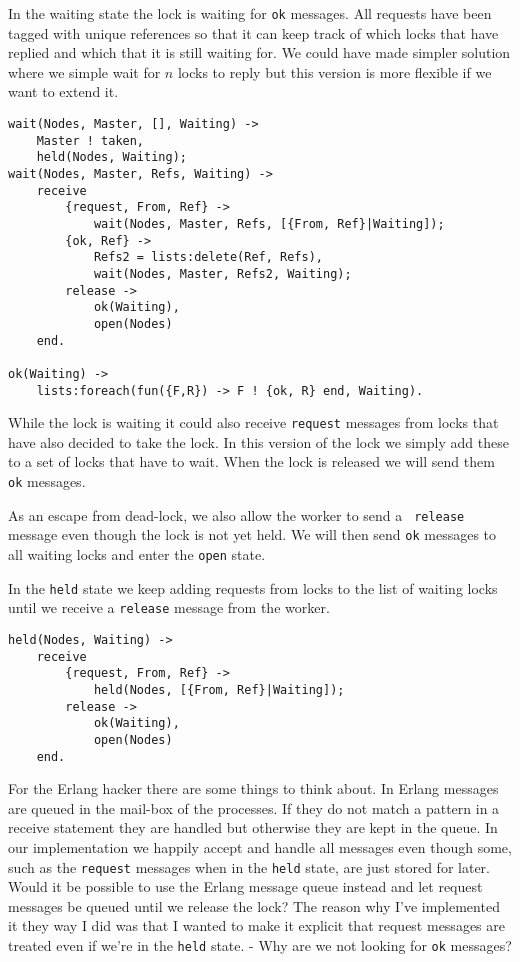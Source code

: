 \documentclass[a4paper, 11pt]{article}
\begin{document}
In the waiting state the lock is waiting for {\tt ok} messages. All requests
have been tagged with unique references so that it can keep track of
which locks that have replied and which that it is still waiting
for. We could have made simpler solution where we simple wait for $n$
locks to reply but this version is more flexible if we want to extend
it.

\begin{verbatim}
wait(Nodes, Master, [], Waiting) ->
    Master ! taken,
    held(Nodes, Waiting);
wait(Nodes, Master, Refs, Waiting) ->
    receive
        {request, From, Ref} ->
            wait(Nodes, Master, Refs, [{From, Ref}|Waiting]);
        {ok, Ref} ->
            Refs2 = lists:delete(Ref, Refs),
            wait(Nodes, Master, Refs2, Waiting);
        release ->
            ok(Waiting),            
            open(Nodes)
    end.

ok(Waiting) ->
    lists:foreach(fun({F,R}) -> F ! {ok, R} end, Waiting).
\end{verbatim}


While the lock is waiting it could also receive {\tt request} messages from
locks that have also decided to take the lock. In this version of the
lock we simply add these to a set of locks that have to wait. When the
lock is released we will send them {\tt ok} messages.

As an escape from dead-lock, we also allow the worker to send a {\tt
release} message even though the lock is not yet held. We will then
send {\tt ok} messages to all waiting locks and enter the {\tt open}
state.

In the {\tt held} state we keep adding requests from locks to the list
of waiting locks until we receive a {\tt release} message from the
worker.

\begin{verbatim}
held(Nodes, Waiting) ->
    receive
        {request, From, Ref} ->
            held(Nodes, [{From, Ref}|Waiting]);
        release ->
            ok(Waiting),
            open(Nodes)
    end.
\end{verbatim}

For the Erlang hacker there are some things to think about. In Erlang
messages are queued in the mail-box of the processes. If they do not
match a pattern in a receive statement they are handled but otherwise
they are kept in the queue. In our implementation we happily accept
and handle all messages even though some, such as the {\tt request}
messages when in the {\tt held} state, are just stored for
later. Would it be possible to use the Erlang message queue instead
and let request messages be queued until we release the lock? The
reason why I've implemented it they way I did was that I wanted to
make it explicit that request messages are treated even if we're in
the {\tt held} state. - Why are we not looking for {\tt ok} messages?
\end{document}
